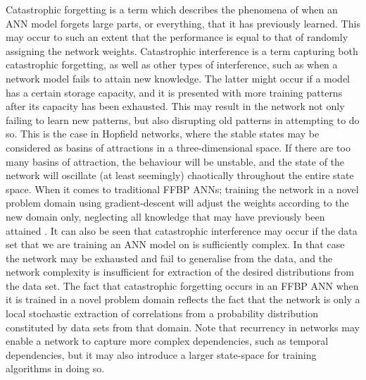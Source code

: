 Catastrophic forgetting \citep{McCloskey1989, Ratcliff1990} is a term which describes the phenomena of when an ANN model forgets large parts, or everything, that it has previously learned. This may occur to such an extent that the performance is equal to that of randomly assigning the network weights. Catastrophic interference is a term capturing both catastrophic forgetting, as well as other types of interference, such as when a network model fails to attain new knowledge. The latter might occur if a model has a certain storage capacity, and it is presented with more training patterns after its capacity has been exhausted. This may result in the network not only failing to learn new patterns, but also disrupting old patterns in attempting to do so. This is the case in Hopfield networks, where the stable states may be considered as basins of attractions in a three-dimensional space. If there are too many basins of attraction, the behaviour will be unstable, and the state of the network will oscillate (at least seemingly) chaotically throughout the entire state space.
When it comes to traditional FFBP ANNs; training the network in a novel problem domain using gradient-descent will adjust the weights according to the new domain only, neglecting all knowledge that may have previously been attained \citep{McCloskey1989, French1999, French2001}.
It can also be seen that catastrophic interference may occur if the data set that we are training an ANN model on is sufficiently complex. In that case the network may be exhausted and fail to generalise from the data, and the network complexity is insufficient for extraction of the desired distributions from the data set. 
The fact that catastrophic forgetting occurs in an FFBP ANN when it is trained in a novel problem domain reflects the fact that the network is only a local stochastic extraction of correlations from a probability distribution constituted by data sets from that domain. Note that recurrency in networks may enable a network to capture more complex dependencies, such as temporal dependencies, but it may also introduce a larger state-space for training algorithms in doing so.
\\

